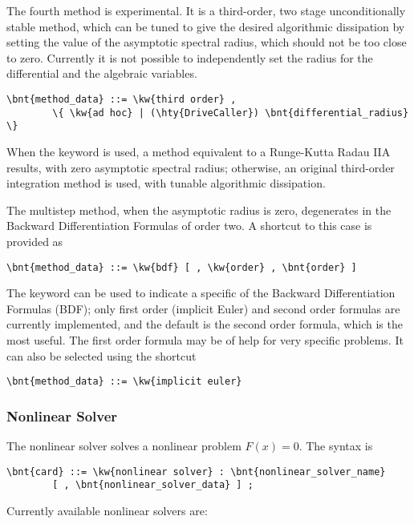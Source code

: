 The fourth method is experimental. It is a third-order,
two stage unconditionally stable method, which can be tuned to give 
the desired algorithmic dissipation by setting the value 
of the asymptotic spectral radius, which should not be 
too close to zero.
Currently it is not possible to independently set the radius 
for the differential and the algebraic variables.
\begin{Verbatim}[commandchars=\\\{\}]
    \bnt{method_data} ::= \kw{third order} ,
        \{ \kw{ad hoc} | (\hty{DriveCaller}) \bnt{differential_radius} \}
\end{Verbatim}
When the keyword  is used, a method equivalent
to a Runge-Kutta Radau IIA results, with zero asymptotic
spectral radius; otherwise, an original third-order
integration method is used, with tunable algorithmic dissipation.

\noindent
The multistep method, when the asymptotic radius is zero, degenerates
in the Backward Differentiation Formulas of order two.
A shortcut to this case is provided as
\begin{Verbatim}[commandchars=\\\{\}]
    \bnt{method_data} ::= \kw{bdf} [ , \kw{order} , \bnt{order} ]
\end{Verbatim}
The keyword  can be used to indicate a specific 
of the Backward Differentiation Formulas (BDF); only first order (implicit Euler) and 
second order formulas are currently implemented, and the default
is the second order formula, which is the most useful.
The first order formula may be of help for very specific problems.
It can also be selected using the shortcut
\begin{Verbatim}[commandchars=\\\{\}]
    \bnt{method_data} ::= \kw{implicit euler}
\end{Verbatim}

\subsubsection{Nonlinear Solver}
The nonlinear solver solves a nonlinear problem $F(x)=0$.
The syntax is
\begin{Verbatim}[commandchars=\\\{\}]
    \bnt{card} ::= \kw{nonlinear solver} : \bnt{nonlinear_solver_name}
        [ , \bnt{nonlinear_solver_data} ] ;
\end{Verbatim}
Currently available nonlinear solvers are:


